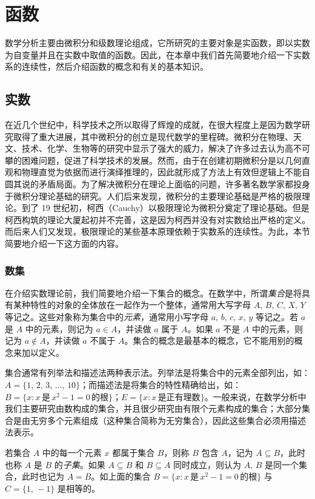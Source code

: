 \documentclass[UTF8,12pt,a4paper,fontset=fandol]{ctexbook}
\begin{document}
\raggedbottom


\chapter{函数}
数学分析主要由微积分和级数理论组成，它所研究的主要对象是实函数，即以实数为自变量并且在实数中取值的函数。因此，在本章中我们首先简要地介绍一下实数系的连续性，然后介绍函数的概念和有关的基本知识。


\section{实数}
在近几个世纪中，科学技术之所以取得了辉煌的成就，在很大程度上是因为数学研究取得了重大进展，其中微积分的创立是现代数学的里程碑。微积分在物理、天文、技术、化学、生物等的研究中显示了强大的威力，解决了许多过去认为高不可攀的困难问题，促进了科学技术的发展。然而，由于在创建初期微积分是以几何直观和物理直觉为依据而进行演绎推理的，因此就形成了方法上有效但逻辑上不能自圆其说的矛盾局面。为了解决微积分在理论上面临的问题，许多著名数学家都投身于微积分理论基础的研究。人们后来发现，微积分的主要理论基础是严格的极限理论。到了 19 世纪初，柯西（Cauchy）以极限理论为微积分奠定了理论基础。但是柯西构筑的理论大厦起初并不完善，这是因为柯西并没有对实数给出严格的定义。而后来人们又发现，极限理论的某些基本原理依赖于实数系的连续性。为此，本节简要地介绍一下这方面的内容。


\subsection{数集}
在介绍实数理论前，我们简要地介绍一下集合的概念。在数学中，所谓\emph{集合}是将具有某种特性的对象的全体放在一起作为一个整体，通常用大写字母 $A,\,B,\,C,\,X,\,Y$ 等记之。这些对象称为集合中的\emph{元素}，通常用小写字母 $a,\,b,\,c,\,x,\,y$ 等记之。若 $a$ 是 $A$ 中的元素，则记为 $a\in A$，并读做 $a$ 属于 $A$。如果 $a$ 不是 $A$ 中的元素，则记为 $a\notin A$，并读做 $a$ 不属于 $A$。集合的概念是最基本的概念，它不能用别的概念来加以定义。


集合通常有列举法和描述法两种表示法。列举法是将集合中的元素全部列出，如：$A=\{1,\,2,\,3,\,\dots,\,10\}$；而描述法是将集合的特性精确给出，如：$B=\{x:x\,\text{是}\,x^2-1=0\,\text{的根}\}$；$E=\{x:x\,\text{是正有理数}\}$。一般来说，在数学分析中我们主要研究由数构成的集合，并且很少研究由有限个元素构成的集合；大部分集合是由无穷多个元素组成（这种集合简称为无穷集合），因此这些集合必须用描述法表示。


若集合 $A$ 中的每一个元素 $x$ 都属于集合 $B$，则称 $B$ 包含 $A$，记为 $A \subseteq B$，此时也称 $A$ 是 $B$ 的\emph{子集}。如果 $A \subseteq B$ 和 $B \subseteq A$ 同时成立，则认为 $A,\,B$ 是同一个集合，此时也记为 $A=B$。如上面的集合 $B=\{x:x\, \text{是}\, x^2-1=0\,\text{的根}\}$ 与 $C=\{1,\, -1\}$ 是相等的。
\end{document}
